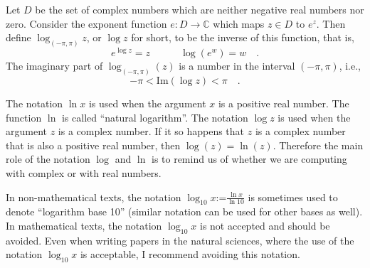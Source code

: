 \documentclass[12pt]{book}
\renewcommand{\Im}{\mathrm{Im}}
\newcommand{\eqdef}{\textbf{:=}}
\begin{document}
Let $D$ be the set of complex numbers which are neither negative real numbers nor zero. Consider the exponent function $e: D\to \mathbb C$ which maps $z\in D$ to $e^z$. Then define $\log_{(-\pi,\pi)} z$, or $\log z$ for short, to be the inverse of this function, that is,
\begin{equation}\boxed{
e^{\log z} = z\quad \quad \quad \log (e^w)=w\quad .
}
\end{equation}
The imaginary part of $\log_{(-\pi,\pi)}(z)$ is a number in the interval $(-\pi,\pi)$, i.e.,
\[
-\pi<\Im(\log z)<\pi\quad .
\]

The notation $\ln x$  is used when the argument $x$ is a positive real number. The function $\ln$ is called ``natural logarithm''. The notation $\log z$ is used when the argument $z$ is a complex number. If it so happens that $z$ is a complex number that is also a positive real number, then $\log(z)=\ln(z)$. Therefore the main role of the notation $\log$ and $\ln$ is to remind us of whether we are computing with complex or with real numbers.

In non-mathematical texts, the notation $\log_{10} x\eqdef \frac{\ln x}{\ln 10}$ is sometimes used to denote ``logarithm base 10'' (similar notation can be used for other bases as well). In mathematical texts, the notation $\log_{10} x$ is not accepted and should be avoided. Even when writing papers in the natural sciences, where the use of the notation $\log_{10} x$ is acceptable, I  recommend avoiding this notation.
\end{document}
